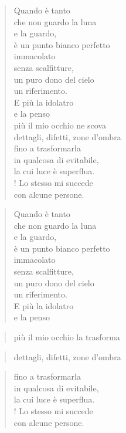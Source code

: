 
\begin{verse}
    
    Quando è tanto\\
    che non guardo la luna\\
    e la guardo,\\
    è un punto bianco perfetto\\
    immacolato\\
    senza scalfitture,\\
    un puro dono del cielo\\
    un riferimento.\\
    E più la idolatro\\ 
    e la penso\\
    più il mio occhio ne scova\\
    dettagli, difetti, zone d'ombra\\
    fino a trasformarla\\
    in qualcosa di evitabile,\\
    la cui luce è superflua.\\!
    Lo stesso mi succede\\
    con alcune persone.
\end{verse}
\newpage
\begin{verse}
    Quando è tanto\\
    che non guardo la luna\\
    e la guardo,\\
    è un punto bianco perfetto\\
    immacolato\\
    senza scalfitture,\\
    un puro dono del cielo\\
    un riferimento.\\
    E più la idolatro\\ 
    e la penso\\
\end{verse}
\vspace{-0.9cm}
\begin{verse}    
    più il mio occhio la trasforma 
\end{verse}
\vspace{-0.9cm}
\begin{verse}    
    \hfill dettagli, difetti, zone d'ombra
\end{verse}
\vspace{-0.9cm}
\begin{verse}
    fino a trasformarla\\
    in qualcosa di evitabile,\\
    la cui luce è superflua.\\!
    Lo stesso mi succede\\
    con alcune persone.
\end{verse}